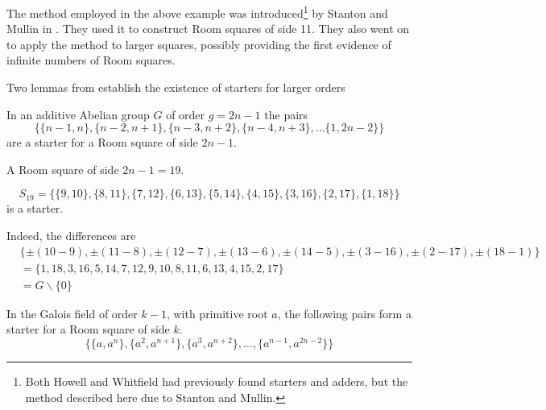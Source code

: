 The  method employed in the above example was introduced\footnote{Both Howell and Whitfield had previously found starters and adders, but the method described here due to Stanton and Mullin.}
by Stanton and Mullin in
\cite{stantonConstructionRoomSquares1968}.
They used it to construct Room squares of side 11.
They also went on to apply the method to larger squares, possibly providing the first evidence of infinite numbers of Room squares.

Two lemmas from
\cite{stantonConstructionRoomSquares1968}
establish the existence of starters for larger orders

\begin{lemma}
In an additive Abelian group $G$ of order $g = 2n - 1$ the pairs
\begin{equation*}
  \{\{n - 1, n\}, \{n - 2, n + 1\}, \{n - 3, n + 2\}, \{n - 4, n + 3\}, \ldots\{1, 2n - 2\}\}
\end{equation*}
are a starter for a Room square of side $2n - 1$.
\end{lemma}

\begin{example}
A Room square of side $2n - 1 = 19$.

\begin{equation*}
S_{19} = \{\{9, 10\}, \{8, 11\}, \{7, 12\}, \{6, 13\}, \{5, 14\}, \{4, 15\}, \{3, 16\}, \{2, 17\}, \{1, 18\}\}
\end{equation*}
is a starter.

Indeed, the differences are
\begin{equation*}
\begin{split}
  & \{\pm(10 - 9), \pm(11 - 8), \pm(12 - 7), \pm(13 - 6), \pm(14 - 5), \pm(3 - 16), \pm(2 - 17), \pm(18 - 1)\} \\ 
  &= \{1, 18, 3, 16, 5, 14, 7, 12, 9, 10, 8, 11, 6, 13, 4, 15, 2, 17\} \\
  &= G \backslash \{0\}
\end{split}
\end{equation*}
\end{example}

\begin{lemma}
In the Galois field of order $k - 1$, with primitive root $a$, the following pairs form a starter for a Room square of side $k$.
\begin{equation}
  \{\{a, a^n\}, \{a^2, a^{n + 1}\}, \{a^3, a^{n + 2}\}, \ldots, \{a^{n - 1}, a^{2n - 2}\}\}
\end{equation}
\end{lemma}

